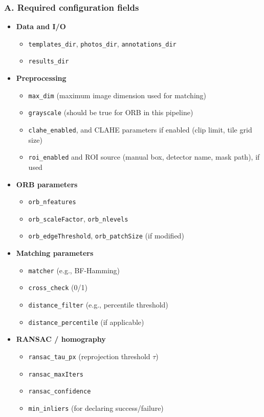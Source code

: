 \subsubsection*{A. Required configuration fields}
\begin{itemize}
  \item \textbf{Data and I/O}
  \begin{itemize}
    \item \texttt{templates\_dir}, \texttt{photos\_dir}, \texttt{annotations\_dir}
    \item \texttt{results\_dir}
  \end{itemize}

  \item \textbf{Preprocessing}
  \begin{itemize}
    \item \texttt{max\_dim} (maximum image dimension used for matching)
    \item \texttt{grayscale} (should be true for ORB in this pipeline)
    \item \texttt{clahe\_enabled}, and CLAHE parameters if enabled (clip limit, tile grid size)
    \item \texttt{roi\_enabled} and ROI source (manual box, detector name, mask path), if used
  \end{itemize}

  \item \textbf{ORB parameters}
  \begin{itemize}
    \item \texttt{orb\_nfeatures}
    \item \texttt{orb\_scaleFactor}, \texttt{orb\_nlevels}
    \item \texttt{orb\_edgeThreshold}, \texttt{orb\_patchSize} (if modified)
  \end{itemize}

  \item \textbf{Matching parameters}
  \begin{itemize}
    \item \texttt{matcher} (e.g., BF-Hamming)
    \item \texttt{cross\_check} (0/1)
    \item \texttt{distance\_filter} (e.g., percentile threshold)
    \item \texttt{distance\_percentile} (if applicable)
  \end{itemize}

  \item \textbf{RANSAC / homography}
  \begin{itemize}
    \item \texttt{ransac\_tau\_px} (reprojection threshold $\tau$)
    \item \texttt{ransac\_maxIters}
    \item \texttt{ransac\_confidence}
    \item \texttt{min\_inliers} (for declaring success/failure)
  \end{itemize}


\end{itemize}
